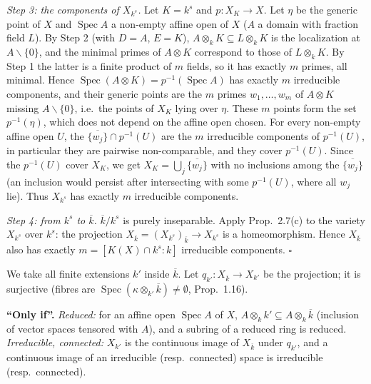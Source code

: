 \documentclass[11pt]{article}
\begin{document}
\emph{Step 3: the components of $X_{k^s}$.} Let $K=k^s$ and $p:X_K\to X$. Let $\eta$ be the generic point of $X$ and $\operatorname{Spec}A$ a non-empty affine open of $X$ ($A$ a domain with fraction field $L$). By Step 2 (with $D=A$, $E=K$), $A\otimes_kK\subseteq L\otimes_kK$ is the localization at $A\smallsetminus\{0\}$, and the minimal primes of $A\otimes K$ correspond to those of $L\otimes_kK$. By Step 1 the latter is a finite product of $m$ fields, so it has exactly $m$ primes, all minimal. Hence $\operatorname{Spec}(A\otimes K)=p^{-1}(\operatorname{Spec}A)$ has exactly $m$ irreducible components, and their generic points are the $m$ primes $w_1,\dots,w_m$ of $A\otimes K$ missing $A\smallsetminus\{0\}$, i.e.\ the points of $X_K$ lying over $\eta$. These $m$ points form the set $p^{-1}(\eta)$, which does not depend on the affine open chosen. For every non-empty affine open $U$, the $\overline{\{w_j\}}\cap p^{-1}(U)$ are the $m$ irreducible components of $p^{-1}(U)$, in particular they are pairwise non-comparable, and they cover $p^{-1}(U)$. Since the $p^{-1}(U)$ cover $X_K$, we get $X_K=\bigcup_j\overline{\{w_j\}}$ with no inclusions among the $\overline{\{w_j\}}$ (an inclusion would persist after intersecting with some $p^{-1}(U)$, where all $w_j$ lie). Thus $X_{k^s}$ has exactly $m$ irreducible components.

\emph{Step 4: from $k^s$ to $\overline k$.} $\overline k/k^s$ is purely inseparable. Apply Prop.~2.7(c) to the variety $X_{k^s}$ over $k^s$: the projection $X_{\overline k}=(X_{k^s})_{\overline k}\to X_{k^s}$ is a homeomorphism. Hence $X_{\overline k}$ also has exactly $m=[K(X)\cap k^s:k]$ irreducible components. \hfill$\square$

\pf
We take all finite extensions $k'$ inside $\overline k$. Let $q_{k'}:X_{\overline k}\to X_{k'}$ be the projection; it is surjective (fibres are $\operatorname{Spec}(\kappa\otimes_{k'}\overline k)\neq\emptyset$, Prop.~1.16).

\textbf{``Only if''.} \emph{Reduced:} for an affine open $\operatorname{Spec}A$ of $X$, $A\otimes_kk'\subseteq A\otimes_k\overline k$ (inclusion of vector spaces tensored with $A$), and a subring of a reduced ring is reduced. \emph{Irreducible, connected:} $X_{k'}$ is the continuous image of $X_{\overline k}$ under $q_{k'}$, and a continuous image of an irreducible (resp.\ connected) space is irreducible (resp.\ connected).
\end{document}
